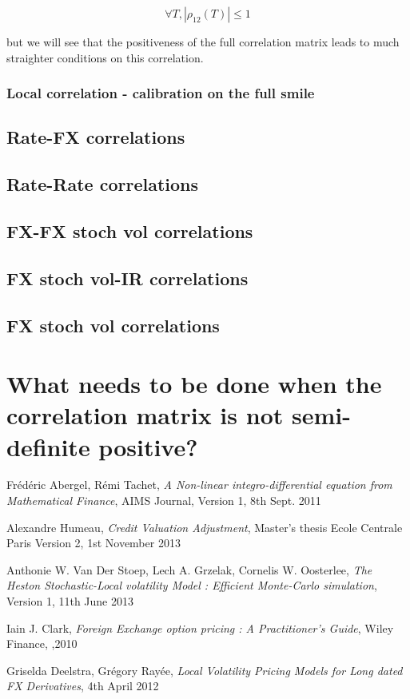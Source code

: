 \documentclass{article}
\begin{document}
\begin{equation}
	\forall T, |\rho_{12}(T)| \leq 1
\end{equation}

\noindent but we will see that the positiveness of the full correlation matrix leads to much straighter conditions on this correlation.

\subsubsection{Local correlation - calibration on the full smile}

\subsection{Rate-FX correlations}

\subsection{Rate-Rate correlations}

\subsection{FX-FX stoch vol correlations}

\subsection{FX stoch vol-IR correlations}

\subsection{FX stoch vol correlations}

\section{What needs to be done when the correlation matrix is not semi-definite positive?}
\begin{thebibliography}{9}

  Frédéric Abergel, Rémi Tachet,
  \emph{A Non-linear integro-differential equation from Mathematical Finance},
  AIMS Journal,
  Version 1, 8th Sept. 2011

 Alexandre Humeau,
 \emph{Credit Valuation Adjustment},
 Master's thesis Ecole Centrale Paris
 Version 2, 
 1st November 2013

 Anthonie W. Van Der Stoep, Lech A. Grzelak, Cornelis W. Oosterlee,
 \emph{The Heston Stochastic-Local volatility Model : Efficient Monte-Carlo simulation},
 Version 1, 11th June 2013

 Iain J. Clark, 
 \emph{Foreign Exchange option pricing : A Practitioner's Guide},
 Wiley Finance,
 ,2010

 Griselda Deelstra, Grégory Rayée,
 \emph{Local Volatility Pricing Models for Long dated FX Derivatives},
 4th April 2012
\end{thebibliography}
\end{document}
